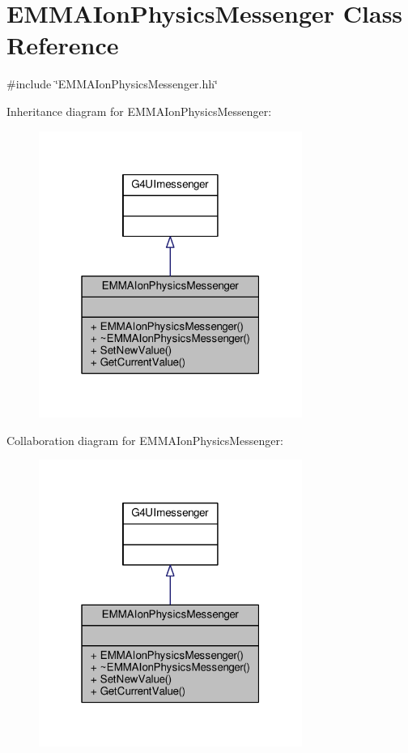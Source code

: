 \hypertarget{classEMMAIonPhysicsMessenger}{}\section{E\+M\+M\+A\+Ion\+Physics\+Messenger Class Reference}
\label{classEMMAIonPhysicsMessenger}


{\ttfamily \#include \char`\"{}E\+M\+M\+A\+Ion\+Physics\+Messenger.\+hh\char`\"{}}



Inheritance diagram for E\+M\+M\+A\+Ion\+Physics\+Messenger\+:
\nopagebreak
\begin{figure}[H]
\begin{center}
\leavevmode
\includegraphics[width=244pt]{classEMMAIonPhysicsMessenger__inherit__graph}
\end{center}
\end{figure}


Collaboration diagram for E\+M\+M\+A\+Ion\+Physics\+Messenger\+:
\nopagebreak
\begin{figure}[H]
\begin{center}
\leavevmode
\includegraphics[width=244pt]{classEMMAIonPhysicsMessenger__coll__graph}
\end{center}
\end{figure}
